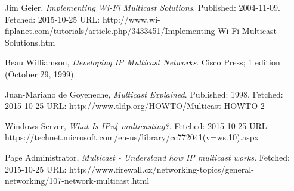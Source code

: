 \documentclass[9pt,a4paper]{acmproc}
\begin{document}
\begin{thebibliography}{9}

  Jim Geier,
  \emph{Implementing Wi-Fi Multicast Solutions}.
  \newline
  Published: 2004-11-09. Fetched: 2015-10-25 \newline
  URL: http://www.wi-fiplanet.com/tutorials/article.php/3433451/Implementing-Wi-Fi-Multicast-Solutions.htm
  
	Beau Williamson,
	\emph{Developing IP Multicast Networks}.
	\newline
Cisco Press; 1 edition (October 29, 1999).

  Juan-Mariano de Goyeneche,
  \emph{Multicast Explained}.
  \newline
  Published: 1998. Fetched: 2015-10-25 \newline
  URL: http://www.tldp.org/HOWTO/Multicast-HOWTO-2
  
  Windows Server,
  \emph{What Is IPv4 multicasting?}.
  \newline
  Fetched: 2015-10-25 \newline
  URL: https://technet.microsoft.com/en-us/library/cc772041(v=ws.10).aspx
  
  Page Administrator,
  \emph{Multicast - Understand how IP multicast works}.
  \newline
  Fetched: 2015-10-25 \newline
  URL: http://www.firewall.cx/networking-topics/general-networking/107-network-multicast.html
  
  
  



\end{thebibliography}
\end{document}
